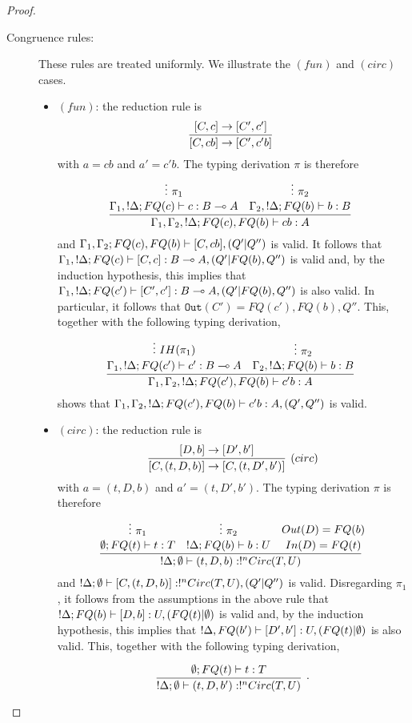 \documentclass{article}
\begin{document}
\begin{proof}
\begin{description}
\item[Congruence rules:] These rules are treated uniformly. We illustrate the 
$(fun)$ and $(circ)$ cases.
\begin{itemize}
  \item $(fun)$: the reduction rule is
  \[
    \infer[]{[C,cb]\to[C',c'b]}{
      [C,c]\to[C',c']
    }
  \]
  with $a=cb$ and $a'=c'b$. The typing derivation $\pi$ is therefore
  \[
    \infer[]{\Gamma_1,\Gamma_2, !\Delta;FQ(c),FQ(b)\entails cb:A}{
      \deduce[]{\Gamma_1, !\Delta;FQ(c)\entails c:B\loli A}{
        \vdots~\pi_1
      } 
      &
      \deduce[]{\Gamma_2, !\Delta ;FQ(b)\entails b:B}{
        \vdots~\pi_2
      } 
    }
  \]
  and $\Gamma_1,\Gamma_2;FQ(c),FQ(b)\vdash [C, cb],(Q'|Q'')$ is valid.
  It follows that $\Gamma_1, !\Delta;FQ(c)\vdash [C,c]:B\multimap A,(Q'|FQ(b),Q'')$ 
  is valid and, by the induction hypothesis, this implies that 
  $\Gamma_1, !\Delta;FQ(c')\vdash [C',c']:B\multimap A,(Q'|FQ(b),Q'')$ is also valid.
  In particular, it follows that $\mathtt{Out}(C')=FQ(c'),FQ(b),Q''$. This, 
  together with the following typing derivation,
  \[
    \infer[]{\Gamma_1,\Gamma_2, !\Delta;FQ(c'),FQ(b)\entails c'b:A}{
      \deduce[]{\Gamma_1, !\Delta;FQ(c')\entails c':B\loli A}{
        \vdots~IH(\pi_1)
      } 
      &
      \deduce[]{\Gamma_2, !\Delta ;FQ(b)\entails b:B}{
        \vdots~\pi_2
      } 
    }
  \]  
  shows that $\Gamma_1,\Gamma_2, !\Delta;FQ(c'),FQ(b)\vdash c'b:A,(Q',Q'')$ 
  is valid.
  \item $(circ)$: the reduction rule is
  \[
    \infer[(circ)]{[C, (t,D,b)]\to [C, (t,D',b')]}{
      [D,b]\to [D',b']
    }
  \]  
  with $a=(t,D,b)$ and $a'=(t,D',b')$. The typing derivation $\pi$ is therefore
  \[
  \infer[]{!\Delta;\emptyset\entails (t,D,b):!^nCirc(T,U)}{
    \deduce[]{\emptyset ; FQ(t)\entails t:T}{
      \vdots~\pi_1
    } 
    &
    \deduce[]{!\Delta ; FQ(b)\entails b:U}{
      \vdots~\pi_2
    }
    &
    \deduce[]{In(D)=FQ(t)}{
      Out(D)=FQ(b)
    }
  }
  \]  
  and $!\Delta ; \emptyset \vdash [C,(t,D,b)]:!^nCirc(T,U),(Q'|Q'')$ is valid. 
  Disregarding $\pi_1$, it follows from the assumptions in the above rule 
  that $!\Delta ; FQ(b)\vdash [D,b]:U, (FQ(t)|\emptyset)$ is valid and, 
  by the induction hypothesis, this implies that 
  $!\Delta,FQ(b')\vdash [D',b']:U,(FQ(t)|\emptyset)$ is also valid.
  This, together with the following typing derivation,
  \[
  \infer[.]{!\Delta;\emptyset\entails (t,D,b'):!^nCirc(T,U)}{
    \deduce[]{\emptyset ; FQ(t)\entails t:T}{
}}\]
\end{itemize}
\end{description}
\end{proof}
\end{document}
